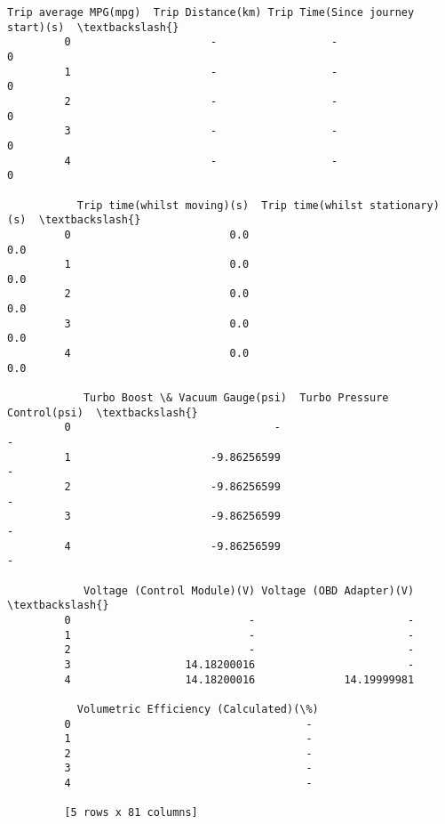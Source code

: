 \documentclass[11pt]{article}
\begin{document}
\begin{Verbatim}[commandchars=\\\{\}]
            Trip average MPG(mpg)  Trip Distance(km) Trip Time(Since journey start)(s)  \textbackslash{}
         0                      -                  -                                 0   
         1                      -                  -                                 0   
         2                      -                  -                                 0   
         3                      -                  -                                 0   
         4                      -                  -                                 0   
         
           Trip time(whilst moving)(s)  Trip time(whilst stationary)(s)  \textbackslash{}
         0                         0.0                              0.0   
         1                         0.0                              0.0   
         2                         0.0                              0.0   
         3                         0.0                              0.0   
         4                         0.0                              0.0   
         
            Turbo Boost \& Vacuum Gauge(psi)  Turbo Pressure Control(psi)  \textbackslash{}
         0                                -                            -   
         1                      -9.86256599                            -   
         2                      -9.86256599                            -   
         3                      -9.86256599                            -   
         4                      -9.86256599                            -   
         
            Voltage (Control Module)(V) Voltage (OBD Adapter)(V)  \textbackslash{}
         0                            -                        -   
         1                            -                        -   
         2                            -                        -   
         3                  14.18200016                        -   
         4                  14.18200016              14.19999981   
         
           Volumetric Efficiency (Calculated)(\%)  
         0                                     -  
         1                                     -  
         2                                     -  
         3                                     -  
         4                                     -  
         
         [5 rows x 81 columns]
\end{Verbatim}
            
\end{document}
